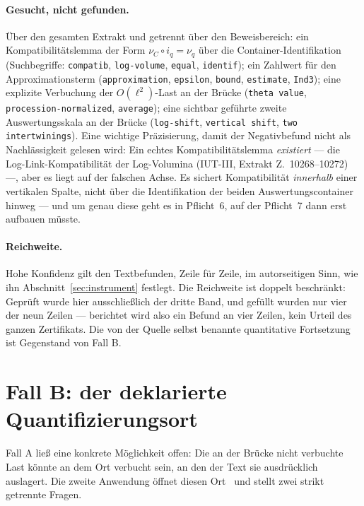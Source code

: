 \documentclass[11pt,a4paper]{article}
\theoremstyle{definition}
\newcommand{\anchor}[2]{(#1, Extrakt Z.~#2)}
\begin{document}
\paragraph{Gesucht, nicht gefunden.} Über den gesamten Extrakt und getrennt über
den Beweisbereich: ein Kompatibilitätslemma der Form $\nu_C \circ i_q = \nu_q$
über die Container-Identifikation (Suchbegriffe: \texttt{compatib},
\texttt{log-volume}, \texttt{equal}, \texttt{identif}); ein Zahlwert für den
Approximationsterm (\texttt{approximation}, \texttt{epsilon}, \texttt{bound},
\texttt{estimate}, \texttt{Ind3}); eine explizite Verbuchung der
$O(\ell^2)$-Last an der Brücke (\texttt{theta value},
\texttt{procession-normalized}, \texttt{average}); eine sichtbar geführte zweite
Auswertungsskala an der Brücke (\texttt{log-shift}, \texttt{vertical shift},
\texttt{two intertwinings}). Eine wichtige Präzisierung, damit der Negativbefund
nicht als Nachlässigkeit gelesen wird: Ein echtes Kompatibilitätslemma
\emph{existiert} --- die Log-Link-Kompatibilität der Log-Volumina
\anchor{IUT-III}{10268--10272} ---, aber es liegt auf der falschen Achse. Es
sichert Kompatibilität \emph{innerhalb} einer vertikalen Spalte, nicht über die
Identifikation der beiden Auswertungscontainer hinweg --- und um genau diese geht
es in Pflicht~6, auf der Pflicht~7 dann erst aufbauen müsste.

\paragraph{Reichweite.} Hohe Konfidenz gilt den Textbefunden, Zeile für Zeile, im
autorseitigen Sinn, wie ihn Abschnitt~\ref{sec:instrument} festlegt. Die Reichweite
ist doppelt beschränkt: Geprüft wurde hier ausschließlich der dritte Band, und
gefüllt wurden nur vier der neun Zeilen --- berichtet wird also ein Befund an vier
Zeilen, kein Urteil des ganzen Zertifikats. Die von der Quelle selbst benannte
quantitative Fortsetzung ist Gegenstand von Fall B.

\section{Fall B: der deklarierte Quantifizierungsort}
\label{sec:caseB}

Fall A ließ eine konkrete Möglichkeit offen: Die an der Brücke nicht verbuchte
Last könnte an dem Ort verbucht sein, an den der Text sie ausdrücklich
auslagert. Die zweite Anwendung öffnet diesen Ort~\cite{Mochizuki2021d} und
stellt zwei strikt getrennte Fragen.
\end{document}
